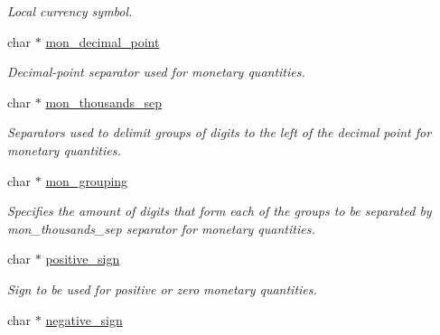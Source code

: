 \begin{DoxyCompactItemize}
\begin{DoxyCompactList}\small\item\em Local currency symbol. \end{DoxyCompactList}\item 
\hypertarget{structlconv_a1aa08afe707c1d5d40b4d01369176480}{char $\ast$ \hyperlink{structlconv_a1aa08afe707c1d5d40b4d01369176480}{mon\-\_\-decimal\-\_\-point}}\label{structlconv_a1aa08afe707c1d5d40b4d01369176480}

\begin{DoxyCompactList}\small\item\em Decimal-\/point separator used for monetary quantities. \end{DoxyCompactList}\item 
\hypertarget{structlconv_a4f04f4fd9ea670d21fc76fb5c77c032d}{char $\ast$ \hyperlink{structlconv_a4f04f4fd9ea670d21fc76fb5c77c032d}{mon\-\_\-thousands\-\_\-sep}}\label{structlconv_a4f04f4fd9ea670d21fc76fb5c77c032d}

\begin{DoxyCompactList}\small\item\em Separators used to delimit groups of digits to the left of the decimal point for monetary quantities. \end{DoxyCompactList}\item 
\hypertarget{structlconv_a12ecf5d2f7ceb0cfe0f66fd3200eef54}{char $\ast$ \hyperlink{structlconv_a12ecf5d2f7ceb0cfe0f66fd3200eef54}{mon\-\_\-grouping}}\label{structlconv_a12ecf5d2f7ceb0cfe0f66fd3200eef54}

\begin{DoxyCompactList}\small\item\em Specifies the amount of digits that form each of the groups to be separated by mon\-\_\-thousands\-\_\-sep separator for monetary quantities. \end{DoxyCompactList}\item 
\hypertarget{structlconv_a74bf5f6f32624be629f7de0dabd58a96}{char $\ast$ \hyperlink{structlconv_a74bf5f6f32624be629f7de0dabd58a96}{positive\-\_\-sign}}\label{structlconv_a74bf5f6f32624be629f7de0dabd58a96}

\begin{DoxyCompactList}\small\item\em Sign to be used for positive or zero monetary quantities. \end{DoxyCompactList}\item 
\hypertarget{structlconv_a40dbb1b1d7fdf4926145138f5d8f6f5f}{char $\ast$ \hyperlink{structlconv_a40dbb1b1d7fdf4926145138f5d8f6f5f}{negative\-\_\-sign}}\label{structlconv_a40dbb1b1d7fdf4926145138f5d8f6f5f}


\end{DoxyCompactItemize}

